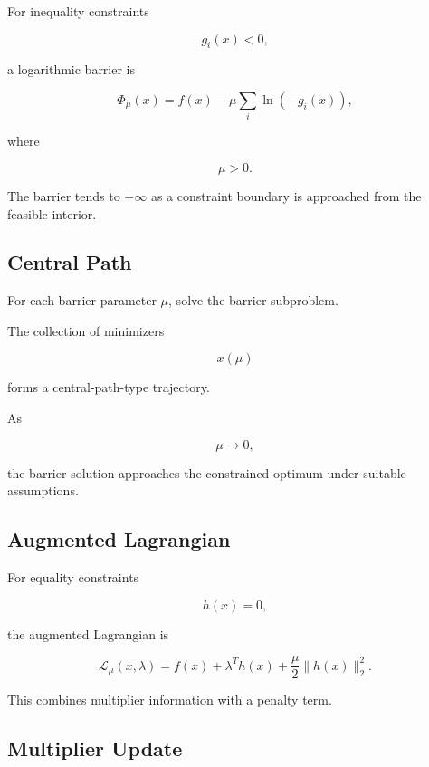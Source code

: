 For inequality constraints

\[
g_i(x)<0,
\]

a logarithmic barrier is

\[
\boxed{
\Phi_\mu(x)
=
f(x)
-
\mu
\sum_i
\ln
(
-g_i(x)
),
}
\]

where

\[
\mu>0.
\]

The barrier tends to \(+\infty\) as a constraint boundary is approached
from the feasible interior.

\subsection{Central Path}
\label{subsec:numerical-central-path}

For each barrier parameter \(\mu\), solve the barrier subproblem.

The collection of minimizers

\[
\boxed{
x(\mu)
}
\]

forms a central-path-type trajectory.

As

\[
\mu\to0,
\]

the barrier solution approaches the constrained optimum under suitable
assumptions.

\subsection{Augmented Lagrangian}
\label{subsec:numerical-augmented-lagrangian}

For equality constraints

\[
h(x)=0,
\]

the augmented Lagrangian is

\[
\boxed{
\mathcal{L}_\mu(x,\lambda)
=
f(x)
+
\lambda^Th(x)
+
\frac{\mu}{2}
\|h(x)\|_2^2.
}
\]

This combines multiplier information with a penalty term.

\subsection{Multiplier Update}
\label{subsec:augmented-lagrangian-multiplier-update}

